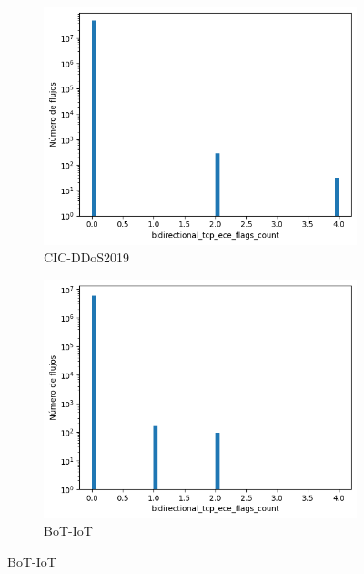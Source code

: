 \begin{figure}[H]
    \centering
    \begin{subfigure}[b]{0.32\textwidth}
        \centering
        \includegraphics[width=\textwidth]{media/packet_pincer_cicddos/bidirectional_tcp_ece_flags_count_linear_x_log_y.png}
        \caption{CIC-DDoS2019}
    \end{subfigure}
    \hfill
    \begin{subfigure}[b]{0.32\textwidth}
        \centering
        \includegraphics[width=\linewidth]{media/packet_pincer_botiot/bidirectional_tcp_ece_flags_count_linear_x_log_y.png}
        \caption{BoT-IoT}
    \end{subfigure}
    \hfill

\end{figure}
